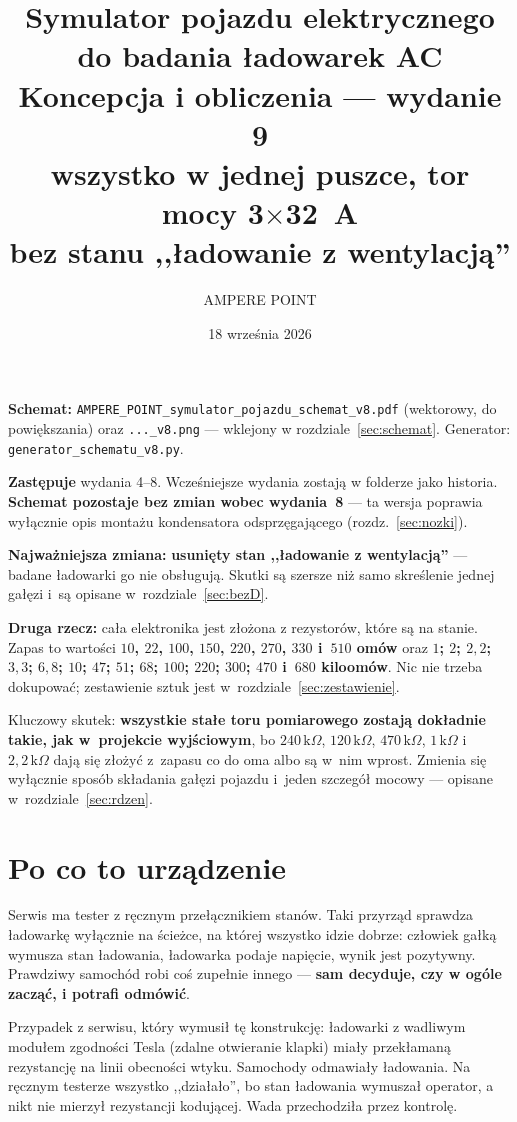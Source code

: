 \documentclass[a4paper,11pt]{article}
\title{\vspace{-1.5cm}Symulator pojazdu elektrycznego do badania ładowarek AC\\[2mm]
\large Koncepcja i obliczenia --- wydanie 9\\[1mm]
\normalsize wszystko w jednej puszce, tor mocy 3$\times$32~A\\[1mm]
\normalsize bez stanu ,,ładowanie z wentylacją''}
\author{AMPERE POINT}
\date{18 września 2026}
\newcommand{\kohm}{\,\mathrm{k}\Omega}
\begin{document}
\maketitle
\thispagestyle{empty}

\noindent\textbf{Schemat:} \texttt{AMPERE\_POINT\_symulator\_pojazdu\_schemat\_v8.pdf}
(wektorowy, do powiększania) oraz \texttt{...\_v8.png} --- wklejony w rozdziale~\ref{sec:schemat}.
Generator: \texttt{generator\_schematu\_v8.py}.

\noindent\textbf{Zastępuje} wydania 4--8. Wcześniejsze wydania zostają w folderze jako
historia. \textbf{Schemat pozostaje bez zmian wobec wydania~8} --- ta wersja poprawia
wyłącznie opis montażu kondensatora odsprzęgającego (rozdz.~\ref{sec:nozki}).

\noindent\textbf{Najważniejsza zmiana:} \textbf{usunięty stan ,,ładowanie z wentylacją''}
--- badane ładowarki go nie obsługują. Skutki są szersze niż samo skreślenie jednej gałęzi
i~są opisane w~rozdziale~\ref{sec:bezD}.

\noindent\textbf{Druga rzecz:} cała elektronika jest złożona z rezystorów, które
są na stanie. Zapas to wartości \textbf{$10$, $22$, $100$, $150$, $220$, $270$, $330$
i~$510$ omów} oraz \textbf{$1$; $2$; $2{,}2$; $3{,}3$; $6{,}8$; $10$; $47$; $51$; $68$;
$100$; $220$; $300$; $470$ i~$680$ kiloomów}. Nic nie trzeba dokupować; zestawienie sztuk
jest w~rozdziale~\ref{sec:zestawienie}.

\noindent Kluczowy skutek: \textbf{wszystkie stałe toru pomiarowego zostają dokładnie takie,
jak w~projekcie wyjściowym}, bo $240\kohm$, $120\kohm$, $470\kohm$, $1\kohm$ i~$2{,}2\kohm$
dają się złożyć z~zapasu co do oma albo są w~nim wprost. Zmienia się wyłącznie sposób
składania gałęzi pojazdu i~jeden szczegół mocowy --- opisane w~rozdziale~\ref{sec:rdzen}.

\tableofcontents

\section{Po co to urządzenie}

Serwis ma tester z ręcznym przełącznikiem stanów. Taki przyrząd sprawdza ładowarkę
wyłącznie na ścieżce, na której wszystko idzie dobrze: człowiek gałką wymusza stan
ładowania, ładowarka podaje napięcie, wynik jest pozytywny. Prawdziwy samochód robi
coś zupełnie innego --- \textbf{sam decyduje, czy w ogóle zacząć, i potrafi odmówić}.

Przypadek z serwisu, który wymusił tę konstrukcję: ładowarki z wadliwym modułem
zgodności Tesla (zdalne otwieranie klapki) miały przekłamaną rezystancję na linii
obecności wtyku. Samochody odmawiały ładowania. Na ręcznym testerze wszystko
,,działało'', bo stan ładowania wymuszał operator, a nikt nie mierzył rezystancji
kodującej. Wada przechodziła przez kontrolę.
\end{document}
